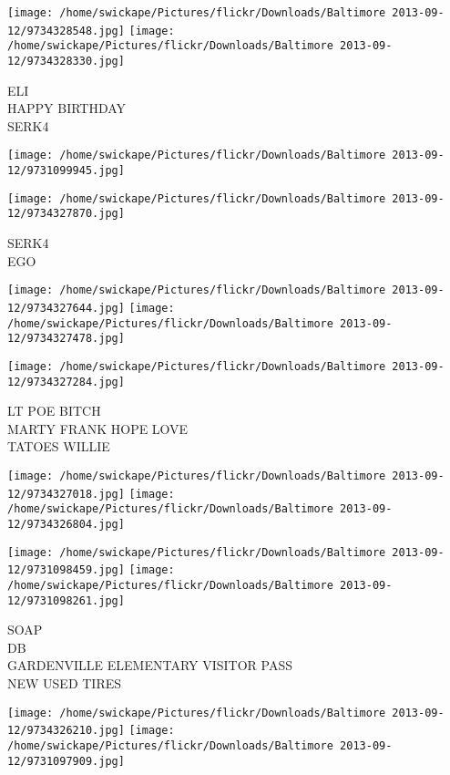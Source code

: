 \documentclass[10pt,letterpaper]{article}
\begin{document}
\vspace{0.25in}
\texttt{[image: /home/swickape/Pictures/flickr/Downloads/Baltimore 2013-09-12/9734328548.jpg]}
\texttt{[image: /home/swickape/Pictures/flickr/Downloads/Baltimore 2013-09-12/9734328330.jpg]}

ELI\\
HAPPY BIRTHDAY\\
SERK4
\pagebreak

\texttt{[image: /home/swickape/Pictures/flickr/Downloads/Baltimore 2013-09-12/9731099945.jpg]}

\vspace{0.25in}
\texttt{[image: /home/swickape/Pictures/flickr/Downloads/Baltimore 2013-09-12/9734327870.jpg]}

SERK4\\
EGO
\pagebreak

\texttt{[image: /home/swickape/Pictures/flickr/Downloads/Baltimore 2013-09-12/9734327644.jpg]}
\texttt{[image: /home/swickape/Pictures/flickr/Downloads/Baltimore 2013-09-12/9734327478.jpg]}

\vspace{0.25in}
\texttt{[image: /home/swickape/Pictures/flickr/Downloads/Baltimore 2013-09-12/9734327284.jpg]}

LT POE BITCH\\
MARTY FRANK HOPE LOVE\\
TATOES WILLIE
\pagebreak

\texttt{[image: /home/swickape/Pictures/flickr/Downloads/Baltimore 2013-09-12/9734327018.jpg]}
\texttt{[image: /home/swickape/Pictures/flickr/Downloads/Baltimore 2013-09-12/9734326804.jpg]}

\texttt{[image: /home/swickape/Pictures/flickr/Downloads/Baltimore 2013-09-12/9731098459.jpg]}
\texttt{[image: /home/swickape/Pictures/flickr/Downloads/Baltimore 2013-09-12/9731098261.jpg]}

SOAP\\
DB\\
GARDENVILLE ELEMENTARY VISITOR PASS\\
NEW USED TIRES
\pagebreak

\texttt{[image: /home/swickape/Pictures/flickr/Downloads/Baltimore 2013-09-12/9734326210.jpg]}
\texttt{[image: /home/swickape/Pictures/flickr/Downloads/Baltimore 2013-09-12/9731097909.jpg]}
\end{document}
